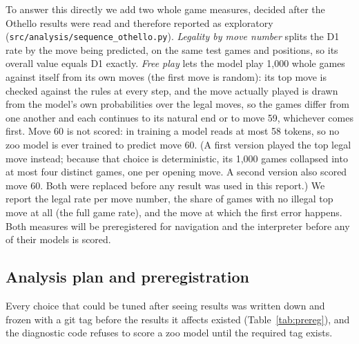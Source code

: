 \documentclass[11pt]{scrartcl}
\begin{document}
To answer this directly we add two whole game measures, decided after the Othello results were read and
therefore reported as exploratory (\texttt{src/analysis/sequence\_othello.py}). \emph{Legality by move
number} splits the D1 rate by the move being predicted, on the same test games and positions, so its overall
value equals D1 exactly. \emph{Free play} lets the model play 1,000 whole games against itself from its own
moves (the first move is random): its top move is checked against the rules at every step, and the move
actually played is drawn from the model's own probabilities over the legal moves, so the games differ from one
another and each continues to its natural end or to move 59, whichever comes first. Move 60 is not scored: in
training a model reads at most 58 tokens, so no zoo model is ever trained to predict move 60. (A first version
played the top legal move instead; because that choice is deterministic, its 1,000 games collapsed into at most
four distinct games, one per opening move. A second version also scored move 60. Both were replaced before any
result was used in this report.)
We report the legal rate per move number, the share of games with no illegal top move at all (the full game
rate), and the move at which the first error happens. Both measures will be preregistered for navigation and the interpreter before any of their models is
scored.

\subsection{Analysis plan and preregistration}
\label{sec:analysis}

Every choice that could be tuned after seeing results was written down and frozen with a git tag before the
results it affects existed (Table~\ref{tab:prereg}), and the diagnostic code refuses to score a zoo model until
the required tag exists.
\end{document}
